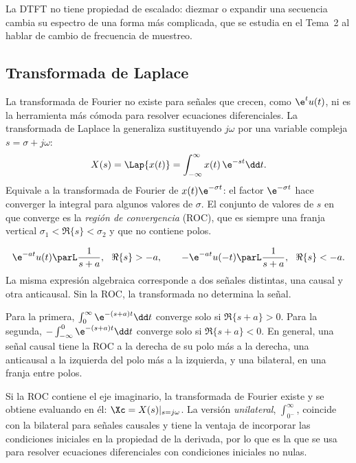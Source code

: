 \documentclass[11pt,a4paper]{scrartcl}
\begin{document}
La DTFT no tiene propiedad de escalado: diezmar o expandir una secuencia cambia su espectro de una forma más complicada, que se estudia en el Tema~2 al hablar de cambio de frecuencia de muestreo.

\subsection{Transformada de Laplace}

La transformada de Fourier no existe para señales que crecen, como $\e^{t}u(t)$, ni es la herramienta más cómoda para resolver ecuaciones diferenciales. La transformada de Laplace la generaliza sustituyendo $j\omega$ por una variable compleja $s=\sigma+j\omega$:
\[
  X(s)=\Lap\{x(t)\}=\int_{-\infty}^{\infty}x(t)\,\e^{-st}\dd t.
\]
Equivale a la transformada de Fourier de $x(t)\e^{-\sigma t}$: el factor $\e^{-\sigma t}$ hace converger la integral para algunos valores de $\sigma$. El conjunto de valores de $s$ en que converge es la \emph{región de convergencia} (ROC), que es siempre una franja vertical $\sigma_1<\Re\{s\}<\sigma_2$ y que no contiene polos.

\begin{importante}
  \[
    \e^{-at}u(t)\parL\frac{1}{s+a},\ \ \Re\{s\}>-a,\qquad
    -\e^{-at}u(-t)\parL\frac{1}{s+a},\ \ \Re\{s\}<-a.
  \]
  La misma expresión algebraica corresponde a dos señales distintas, una causal y otra anticausal. Sin la ROC, la transformada no determina la señal.
\end{importante}

Para la primera, $\int_0^\infty\e^{-(s+a)t}\dd t$ converge solo si $\Re\{s+a\}>0$. Para la segunda, $-\int_{-\infty}^0\e^{-(s+a)t}\dd t$ converge solo si $\Re\{s+a\}<0$. En general, una señal causal tiene la ROC a la derecha de su polo más a la derecha, una anticausal a la izquierda del polo más a la izquierda, y una bilateral, en una franja entre polos.

Si la ROC contiene el eje imaginario, la transformada de Fourier existe y se obtiene evaluando en él: $\Xc=X(s)|_{s=j\omega}$. La versión \emph{unilateral}, $\int_{0^-}^\infty$, coincide con la bilateral para señales causales y tiene la ventaja de incorporar las condiciones iniciales en la propiedad de la derivada, por lo que es la que se usa para resolver ecuaciones diferenciales con condiciones iniciales no nulas.
\end{document}
